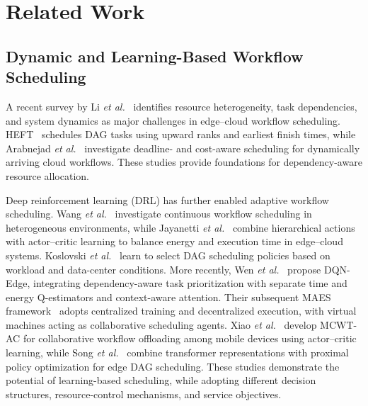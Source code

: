 \documentclass[journal]{IEEEtran}
\begin{document}
\section{Related Work}

\subsection{Dynamic and Learning-Based Workflow Scheduling}
A recent survey by Li \emph{et al.}~\cite{li2026survey} identifies resource heterogeneity, task dependencies, and system dynamics as major challenges in edge--cloud workflow scheduling. HEFT~\cite{topcuoglu2002} schedules DAG tasks using upward ranks and earliest finish times, while Arabnejad \emph{et al.}~\cite{arabnejad2019} investigate deadline- and cost-aware scheduling for dynamically arriving cloud workflows. These studies provide foundations for dependency-aware resource allocation.

Deep reinforcement learning (DRL) has further enabled adaptive workflow scheduling. Wang \emph{et al.}~\cite{wang2025continuous} investigate continuous workflow scheduling in heterogeneous environments, while Jayanetti \emph{et al.}~\cite{jayanetti2022} combine hierarchical actions with actor--critic learning to balance energy and execution time in edge--cloud systems. Koslovski \emph{et al.}~\cite{koslovski2024} learn to select DAG scheduling policies based on workload and data-center conditions. More recently, Wen \emph{et al.}~\cite{wen2026} propose DQN-Edge, integrating dependency-aware task prioritization with separate time and energy Q-estimators and context-aware attention. Their subsequent MAES framework~\cite{wen2026maes} adopts centralized training and decentralized execution, with virtual machines acting as collaborative scheduling agents. Xiao \emph{et al.}~\cite{xiao2025} develop MCWT-AC for collaborative workflow offloading among mobile devices using actor--critic learning, while Song \emph{et al.}~\cite{song2026} combine transformer representations with proximal policy optimization for edge DAG scheduling. These studies demonstrate the potential of learning-based scheduling, while adopting different decision structures, resource-control mechanisms, and service objectives.
\end{document}
